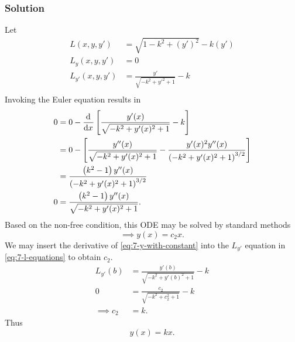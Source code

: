 \documentclass[12pt,twoside]{article}
\begin{document}
\subsubsection*{Solution}
Let
\begin{equation}
  \label{eq:7-l-equations}
  \begin{aligned}
    L(x,y,y') &= \sqrt{1-k^2+{(y')}^2}-k(y') \\
    L_y(x,y,y') &= 0 \\
    L_{y'}(x,y,y') &= \frac{y'}{\sqrt{-k^2+{y'}^2+1}}-k \\
  \end{aligned}
\end{equation}
Invoking the Euler equation results in
\begin{align*}
0 &= 0 - \frac{\mathrm{d}^{} {}}{\mathrm{d}{x}^{}}\left[\frac{y'(x)}{\sqrt{-k^2+y'(x)^2+1}}-k\right] \\
  &= 0 - \left[ \frac{y''(x)}{\sqrt{-k^2+y'(x)^2+1}}-\frac{y'(x)^2 y''(x)}{\left(-k^2+y'(x)^2+1\right)^{3/2}} \right] \\
  &= \frac{\left(k^2-1\right) y''(x)}{\left(-k^2+y'(x)^2+1\right)^{3/2}} \\
  0 &= \frac{\left(k^2-1\right) y''(x)}{\sqrt{-k^2+y'(x)^2+1}}. \\
\end{align*}
Based on the non-free condition, this ODE may be solved by standard methods
\begin{equation}
  \label{eq:7-y-with-constant}
  \implies y(x) = c_2 x.
\end{equation}
We may insert the derivative of \cref{eq:7-y-with-constant} into the $L_{y'}$
equation in \cref{eq:7-l-equations} to obtain $c_2$.
\begin{equation*}
  \begin{aligned}
    L_{y'}(b) &= \frac{y'(b)}{\sqrt{-k^2+{y'(b)}^2+1}}-k \\
    0 &= \frac{c_2}{\sqrt{-k^2+c_2^2+1}}-k \\
    \implies c_2 &= k.
  \end{aligned}
\end{equation*}
Thus
\begin{equation*}
  \boxed{y(x) = k x.}
\end{equation*}
\end{document}
